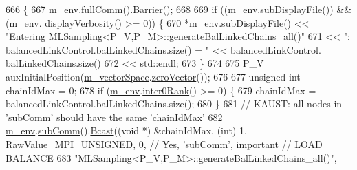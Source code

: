 \begin{DoxyCode}
666 \{
667   \hyperlink{class_q_u_e_s_o_1_1_m_l_sampling_a13f1ca4fe9f94822fe572a743eaced1d}{m\_env}.\hyperlink{class_q_u_e_s_o_1_1_base_environment_a0b0779b41ff304058856e97e1d16b4d4}{fullComm}().\hyperlink{class_q_u_e_s_o_1_1_mpi_comm_a4059971c30e023b272fccaa6aa00c426}{Barrier}();
668 
669   \textcolor{keywordflow}{if} ((\hyperlink{class_q_u_e_s_o_1_1_m_l_sampling_a13f1ca4fe9f94822fe572a743eaced1d}{m\_env}.\hyperlink{class_q_u_e_s_o_1_1_base_environment_a8a0064746ae8dddfece4229b9ad374d6}{subDisplayFile}()) && (\hyperlink{class_q_u_e_s_o_1_1_m_l_sampling_a13f1ca4fe9f94822fe572a743eaced1d}{m\_env}.
      \hyperlink{class_q_u_e_s_o_1_1_base_environment_a1fe5f244fc0316a0ab3e37463f108b96}{displayVerbosity}() >= 0)) \{
670     *\hyperlink{class_q_u_e_s_o_1_1_m_l_sampling_a13f1ca4fe9f94822fe572a743eaced1d}{m\_env}.\hyperlink{class_q_u_e_s_o_1_1_base_environment_a8a0064746ae8dddfece4229b9ad374d6}{subDisplayFile}() << \textcolor{stringliteral}{"Entering
       MLSampling<P\_V,P\_M>::generateBalLinkedChains\_all()"}
671                             << \textcolor{stringliteral}{": balancedLinkControl.balLinkedChains.size() = "} << balancedLinkControl.
      balLinkedChains.size()
672                             << std::endl;
673   \}
674 
675   P\_V auxInitialPosition(\hyperlink{class_q_u_e_s_o_1_1_m_l_sampling_a7bc4c72f65ba9166ed94a6e198b0915b}{m\_vectorSpace}.\hyperlink{class_q_u_e_s_o_1_1_vector_space_a92e963bb5cab3eecd290dfe4b8f03b04}{zeroVector}());
676 
677   \textcolor{keywordtype}{unsigned} \textcolor{keywordtype}{int} chainIdMax = 0;
678   \textcolor{keywordflow}{if} (\hyperlink{class_q_u_e_s_o_1_1_m_l_sampling_a13f1ca4fe9f94822fe572a743eaced1d}{m\_env}.\hyperlink{class_q_u_e_s_o_1_1_base_environment_ae106b5bb8a80b655b88b3a26b1e7c185}{inter0Rank}() >= 0) \{
679     chainIdMax = balancedLinkControl.balLinkedChains.size();
680   \}
681   \textcolor{comment}{// KAUST: all nodes in 'subComm' should have the same 'chainIdMax'}
682   \hyperlink{class_q_u_e_s_o_1_1_m_l_sampling_a13f1ca4fe9f94822fe572a743eaced1d}{m\_env}.\hyperlink{class_q_u_e_s_o_1_1_base_environment_affe39f53e3d5d678842413370af09145}{subComm}().\hyperlink{class_q_u_e_s_o_1_1_mpi_comm_abd6af8db8b0c7fd2f5b62e26477a9537}{Bcast}((\textcolor{keywordtype}{void} *) &chainIdMax, (\textcolor{keywordtype}{int}) 1, 
      \hyperlink{_mpi_comm_8h_a06cbfbc33436f6e0dc8a48ff3c49bdfc}{RawValue\_MPI\_UNSIGNED}, 0, \textcolor{comment}{// Yes, 'subComm', important // LOAD BALANCE}
683                         \textcolor{stringliteral}{"MLSampling<P\_V,P\_M>::generateBalLinkedChains\_all()"},

\end{DoxyCode}
